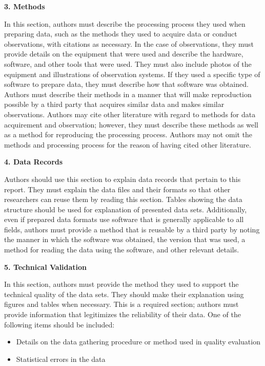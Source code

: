\documentclass[english]{article}
\begin{document}
\begin{center}
{\bf 3. Methods}
\end{center}

 In this section, authors must describe the processing process they used when preparing data, such as the methods they used to acquire data or conduct observations, with citations as necessary.  In the case of observations, they must provide details on the equipment that were used and describe the hardware, software, and other tools that were used. They must also include photos of the equipment and illustrations of observation systems. If they used a specific type of software to prepare data, they must describe how that software was obtained.
 Authors must describe their methods in a manner that will make reproduction possible by a third party that acquires similar data and makes similar observations. Authors may cite other literature with regard to methods for data acquirement and observation; however, they must describe these methods as well as a method for reproducing the processing process. Authors may not omit the methods and processing process for the reason of having cited other literature.

\begin{center}
{\bf 4. Data Records}
\end{center}

 Authors should use this section to explain data records that pertain to this report.  They must explain the data files and their formats so that other researchers can reuse them by reading this section. Tables showing the data structure should be used for explanation of presented data sets.
 Additionally, even if prepared data formats use software that is generally applicable to all fields, authors must provide a method that is reusable by a third party by noting the manner in which the software was obtained, the version that was used, a method for reading the data using the software, and other relevant details.

\begin{center}
{\bf 5. Technical Validation}
\end{center}

 In this section, authors must provide the method they used to support the technical quality of the data sets. They should make their explanation using figures and tables when necessary. This is a required section; authors must provide information that legitimizes the reliability of their data.
One of the following items should be included:
\begin{itemize}
\item Details on the data gathering procedure or method used in quality evaluation
\item Statistical errors in the data
\end{itemize}
\end{document}

